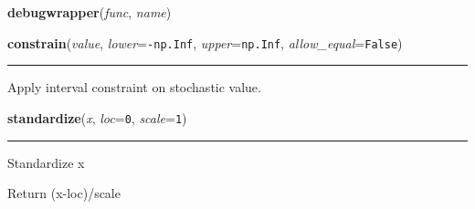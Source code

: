     \vspace{0.5ex}

    \begin{boxedminipage}{\textwidth}

    \raggedright \textbf{debugwrapper}(\textit{func}, \textit{name})

    \end{boxedminipage}

    \label{pymc:distributions:constrain}

    \vspace{0.5ex}

    \begin{boxedminipage}{\textwidth}

    \raggedright \textbf{constrain}(\textit{value}, \textit{lower}=\texttt{-np.Inf}, \textit{upper}=\texttt{np.Inf}, \textit{allow\_equal}=\texttt{False})

    \vspace{-1.5ex}

    \rule{\textwidth}{0.5\fboxrule}

Apply interval constraint on stochastic value.
    \vspace{1ex}

    \end{boxedminipage}

    \label{pymc:distributions:standardize}

    \vspace{0.5ex}

    \begin{boxedminipage}{\textwidth}

    \raggedright \textbf{standardize}(\textit{x}, \textit{loc}=\texttt{0}, \textit{scale}=\texttt{1})

    \vspace{-1.5ex}

    \rule{\textwidth}{0.5\fboxrule}

Standardize x

Return (x-loc)/scale
    \vspace{1ex}

    \end{boxedminipage}

    \label{pymc:distributions:gammaln}

